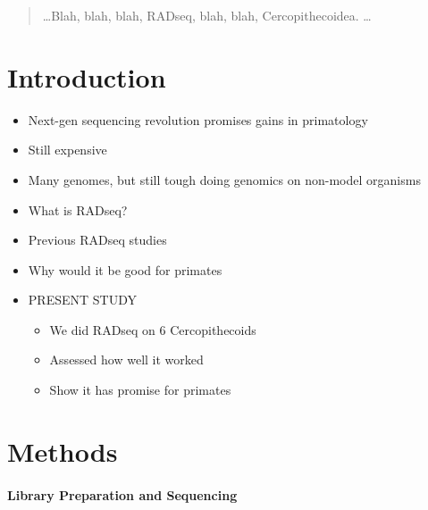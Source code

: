 \documentclass[12pt]{article}
\begin{document}
\maketitle

\begin{abstract}
\ldots Blah, blah, blah, RADseq, blah, blah, Cercopithecoidea. \ldots
\end{abstract}

\section{Introduction}
\begin{itemize}
	\item Next-gen sequencing revolution promises gains in primatology
	\item Still expensive
	\item Many genomes, but still tough doing genomics on non-model organisms
	\item What is RADseq?
	\item Previous RADseq studies
	\item Why would it be good for primates
	\item PRESENT STUDY
	\begin{itemize}
		\item We did RADseq on 6 Cercopithecoids
		\item Assessed how well it worked
		\item Show it has promise for primates
	\end{itemize}
\end{itemize}

\section{Methods}

\paragraph{Library Preparation and Sequencing}
\end{document}
